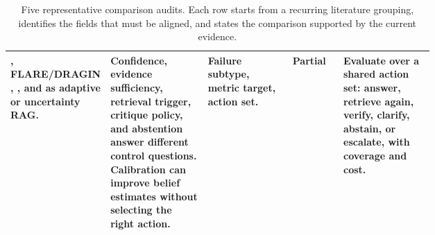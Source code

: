 \begin{table}[t]
\begin{tabularx}{\linewidth}{>{\raggedright\arraybackslash}p{0.16\linewidth}>{\raggedright\arraybackslash}p{0.23\linewidth}>{\raggedright\arraybackslash}p{0.20\linewidth}>{\raggedright\arraybackslash}p{0.12\linewidth}X}
\citet{selfRAG2023}, FLARE/DRAGIN \citep{flare2023active,venue200DRAGIN}, \citet{sufficientContext2024}, and \citet{calibRAG2025} as adaptive or uncertainty RAG. & Confidence, evidence sufficiency, retrieval trigger, critique policy, and abstention answer different control questions. Calibration can improve belief estimates without selecting the right action. & Failure subtype, metric target, action set. & Partial & Evaluate over a shared action set: answer, retrieve again, verify, clarify, abstain, or escalate, with coverage and cost. \\
\bottomrule
\end{tabularx}
\caption{Five representative comparison audits. Each row starts from a recurring literature grouping, identifies the fields that must be aligned, and states the comparison supported by the current evidence.}
\label{tab:main-worked-examples}
\end{table}
